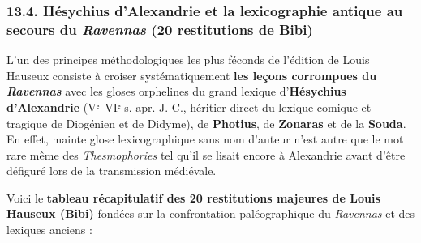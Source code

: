 \documentclass[11pt, a4paper, twoside]{article}
\renewcommand{\_}{\origunderscore\penalty0\relax}
\newcommand{\Bibi}{\textit{Bibi}}
\def\Bibi{Bibi}%
\begin{document}
\subsubsection{13.4. Hésychius d'Alexandrie et la lexicographie antique au secours du \textit{Ravennas} (20 restitutions de \Bibi{})}

L'un des principes méthodologiques les plus féconds de l'édition de Louis Hauseux consiste à croiser systématiquement \textbf{les leçons corrompues du \textit{Ravennas}} avec les gloses orphelines du grand lexique d'\textbf{Hésychius d'Alexandrie} (Vᵉ–VIᵉ s. apr. J.-C., héritier direct du lexique comique et tragique de Diogénien et de Didyme), de \textbf{Photius}, de \textbf{Zonaras} et de la \textbf{Souda}. En effet, mainte glose lexicographique sans nom d'auteur n'est autre que le mot rare même des \textit{Thesmophories} tel qu'il se lisait encore à Alexandrie avant d'être défiguré lors de la transmission médiévale.

Voici le \textbf{tableau récapitulatif des 20 restitutions majeures de Louis Hauseux (\Bibi{})} fondées sur la confrontation paléographique du \textit{Ravennas} et des lexiques anciens :
\end{document}

